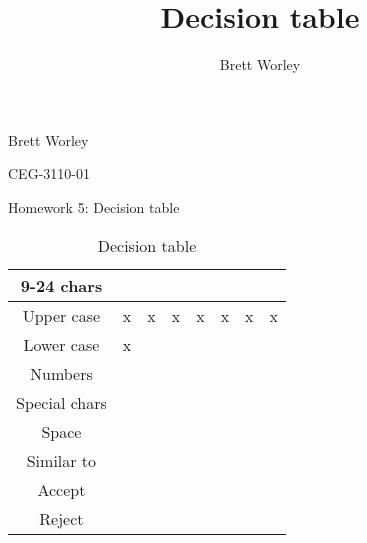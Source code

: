 \documentclass[12pt,letterpaper]{article}
\author{Brett Worley}
\title{Decision table}
\begin{document}
Brett Worley

CEG-3110-01

\centerline{ Homework 5: Decision table}

\begin{table}[h]
  \begin{center}
    \caption{Decision table}
    \label{tab:Main table}
    
    \begin{tabular}{c|c|c|c|c|c|c|c}
    \hline
    9-24 chars & & & & & & & \\
    \hline
    Upper case & x & x & x & x & x & x & x \\
    \hline
    Lower case & x & & & & & & \\
    \hline
    Numbers & & & & & & & \\
    \hline
    Special chars & & & & & & & \\
    \hline
    Space & & & & & & & \\
    \hline
    Similar to & & & & & & & \\
    \midrule
    Accept & & & & & & & \\
    \hline
    Reject & & & & & & & \\
    \end{tabular}
  \end{center}
\end{table}
\end{document}
